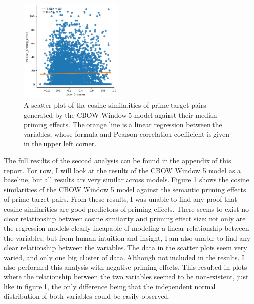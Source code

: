\documentclass{IEEEtran}
\begin{document}
\begin{figure}
    \centering
    \includegraphics[width=0.45\textwidth]{images/cbow_5_cosine_against_priming_effect.png}
    \caption{A scatter plot of the cosine similarities of prime-target pairs generated by the CBOW Window 5 model against their median priming effects. The orange line is a linear regression between the variables, whose formula and Pearson correlation coefficient is given in the upper left corner.}
    \label{fig:cbow_5_cosine_against_priming_effect}
\end{figure}

The full results of the second analysis can be found in the appendix of this report.
For now, I will look at the results of the CBOW Window 5 model as a baseline, but all results are very similar across models.
Figure \ref{fig:cbow_5_cosine_against_priming_effect} shows the cosine similarities of the CBOW Window 5 model against the semantic priming effects of prime-target pairs.
From these results, I was unable to find any proof that cosine similarities are good predictors of priming effects.
There seems to exist no clear relationship between cosine similarity and priming effect size: not only are the regression models clearly incapable of modeling a linear relationship between the variables, but from human intuition and insight, I am also unable to find any clear relationship between the variables.
The data in the scatter plots seem very varied, and only one big cluster of data.
Although not included in the results, I also performed this analysis with negative priming effects.
This resulted in plots where the relationship between the two variables seemed to be non-existent, just like in figure \ref{fig:cbow_5_cosine_against_priming_effect}, the only difference being that the independent normal distribution of both variables could be easily observed.
\end{document}
